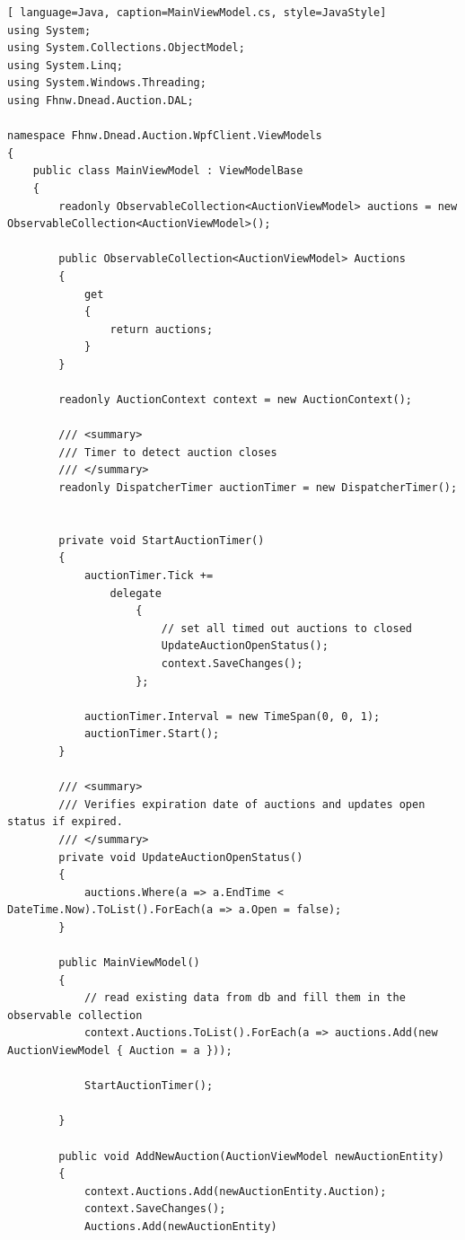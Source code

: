 \documentclass[10pt]{article}
\begin{document}
\begin{lstlisting}[ language=Java, caption=MainViewModel.cs, style=JavaStyle]
using System;
using System.Collections.ObjectModel;
using System.Linq;
using System.Windows.Threading;
using Fhnw.Dnead.Auction.DAL;

namespace Fhnw.Dnead.Auction.WpfClient.ViewModels
{
    public class MainViewModel : ViewModelBase
    {
        readonly ObservableCollection<AuctionViewModel> auctions = new ObservableCollection<AuctionViewModel>();

        public ObservableCollection<AuctionViewModel> Auctions
        {
            get
            {
                return auctions;
            }
        }

        readonly AuctionContext context = new AuctionContext();

        /// <summary>
        /// Timer to detect auction closes
        /// </summary>
        readonly DispatcherTimer auctionTimer = new DispatcherTimer();


        private void StartAuctionTimer()
        {
            auctionTimer.Tick +=
                delegate
                    {
                        // set all timed out auctions to closed
                        UpdateAuctionOpenStatus();
                        context.SaveChanges();
                    };

            auctionTimer.Interval = new TimeSpan(0, 0, 1);
            auctionTimer.Start();
        }

        /// <summary>
        /// Verifies expiration date of auctions and updates open status if expired.
        /// </summary>
        private void UpdateAuctionOpenStatus()
        {
            auctions.Where(a => a.EndTime < DateTime.Now).ToList().ForEach(a => a.Open = false);
        }

        public MainViewModel()
        {
            // read existing data from db and fill them in the observable collection
            context.Auctions.ToList().ForEach(a => auctions.Add(new AuctionViewModel { Auction = a }));

            StartAuctionTimer();

        }

        public void AddNewAuction(AuctionViewModel newAuctionEntity)
        {
            context.Auctions.Add(newAuctionEntity.Auction);
            context.SaveChanges();
            Auctions.Add(newAuctionEntity)
\end{lstlisting}
\end{document}
